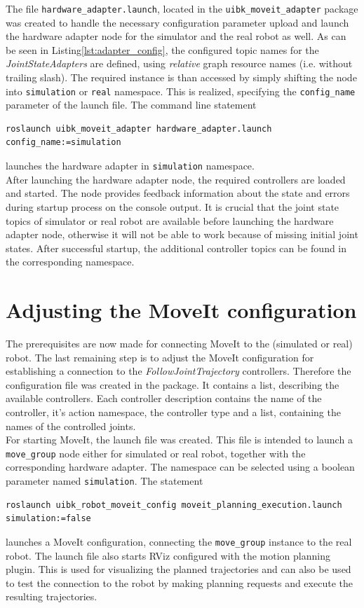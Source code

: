 The file \texttt{hardware\_adapter.launch}, located in the \texttt{uibk\_moveit\_adapter} package was created to handle the necessary configuration parameter upload and launch the hardware adapter node for the simulator and the real robot as well. As can be seen in Listing\ref{lst:adapter_config}, the configured topic names for the \emph{JointStateAdapters} are defined, using \emph{relative} graph resource names (i.e. without trailing slash). The required instance is than accessed by simply shifting the node into \texttt{simulation} or \texttt{real} namespace. This is realized, specifying the \texttt{config\_name} parameter of the launch file. The command line statement
\begin{verbatim}
roslaunch uibk_moveit_adapter hardware_adapter.launch config_name:=simulation
\end{verbatim}
launches the hardware adapter in \texttt{simulation} namespace.\\

After launching the hardware adapter node, the required controllers are loaded and started. The node provides feedback information about the state and errors during startup process on the console output. It is crucial that the joint state topics of simulator or real robot are available before launching the hardware adapter node, otherwise it will not be able to work because of missing initial joint states. After successful startup, the additional controller topics can be found in the corresponding namespace.

\section{Adjusting the MoveIt configuration}

The prerequisites are now made for connecting MoveIt to the (simulated or real) robot. The last remaining step is to adjust the MoveIt configuration for establishing a connection to the \emph{FollowJointTrajectory} controllers. Therefore the configuration file  was created in the  package. It contains a list, describing the available controllers. Each controller description contains the name of the controller, it's action namespace, the controller type and a list, containing the names of the controlled joints.\\

For starting MoveIt, the launch file  was created. This file is intended to launch a \texttt{move\_group} node either for simulated or real robot, together with the corresponding hardware adapter. The namespace can be selected using a boolean parameter named \texttt{simulation}. The statement
{\small 
\begin{verbatim}
roslaunch uibk_robot_moveit_config moveit_planning_execution.launch simulation:=false
\end{verbatim}}
launches a MoveIt configuration, connecting the \texttt{move\_group} instance to the real robot. The launch file also starts RViz configured with the motion planning plugin. This is used for visualizing the planned trajectories and can also be used to test the connection to the robot by making planning requests and execute the resulting trajectories.